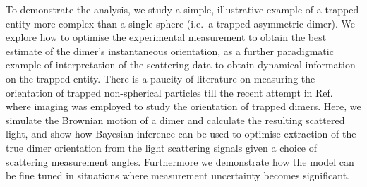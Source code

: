 \documentclass[final,  3p]{elsarticle}
\begin{document}
To demonstrate the analysis, we study a simple, illustrative example of a trapped entity more complex than a single sphere (i.e.\ a trapped asymmetric dimer).  We explore how to optimise the experimental measurement to obtain the best estimate of the dimer's instantaneous orientation, as a further paradigmatic example of interpretation of the scattering data to obtain dynamical information on the trapped entity. There is a paucity of literature on measuring the orientation of trapped non-spherical particles till the recent attempt in Ref.~\cite{raudsepp2022estimating} where imaging was employed to study the orientation of trapped dimers. Here, we simulate the Brownian motion of a dimer and calculate the resulting scattered light, and show how Bayesian inference can be used to optimise extraction of the true dimer orientation from the light scattering signals given a choice of scattering measurement angles. Furthermore we demonstrate how the model can be fine tuned in situations where measurement uncertainty becomes significant. 
\end{document}
